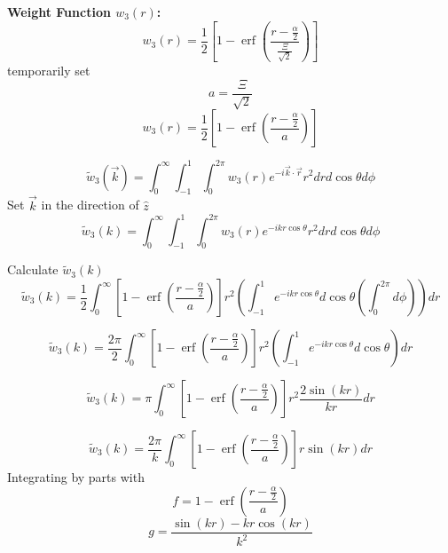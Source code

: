 \documentclass[letterpaper,twocolumn,amsmath,amssymb,prb]{revtex4-1}
\begin{document}
\begin{widetext}
\noindent\textbf{Weight Function $w_3(r)$:}
\begin{equation}
    w_3(r)=\frac{1}{2}\left[1-\operatorname{erf}\left(\frac{r-\frac{\alpha}{2}}{\frac{\Xi}{\sqrt{2}}}\right)\right]
\end{equation}
temporarily set 
\begin{equation}{a=\frac{\Xi}{\sqrt{2}}}\end{equation}
\begin{equation}{w_3(r)=\frac{1}{2}\left[1-\operatorname{erf}\left(\frac{r-\frac{\alpha}{2}}{a}\right)\right]}\end{equation}

\begin{equation}{\widetilde{w}_3(\vec{k})=\int_{0}^{\infty}\int_{-1}^{1}\int_{0}^{2\pi}w_3(r)e^{-i\vec{k}\cdot{\vec{r}}}r^2d{r}d{\cos\theta}d{\phi}}\end{equation}
Set $\vec{k}$ in the direction of $\hat{z}$ 
\begin{equation}{\widetilde{w}_3(k)=\int_{0}^{\infty}\int_{-1}^{1}\int_{0}^{2\pi}w_3(r)e^{-ikr\cos\theta}r^2d{r}d{\cos\theta}d{\phi}}\end{equation}

\noindent Calculate $\widetilde{w}_3(k)$ 
\begin{equation}{\widetilde{w}_3(k)=\frac{1}{2}\int_{0}^{\infty}\left[1-\operatorname{erf}\left(\frac{r-\frac{\alpha}{2}}{a}\right)\right]r^2\left(\int_{-1}^{1}e^{-ikr\cos\theta}d{\cos\theta}\left(\int_{0}^{2\pi}d{\phi}\right)\right)d{r}}\end{equation}
\[{}\]

\begin{equation}{\widetilde{w}_3(k)=\frac{2\pi}{2}\int_{0}^{\infty}\left[1-\operatorname{erf}\left(\frac{r-\frac{\alpha}{2}}{a}\right)\right]r^2\left(\int_{-1}^{1}e^{-ikr\cos\theta}d{\cos\theta}\right)d{r}}\end{equation}

\begin{equation}{\widetilde{w}_3(k)=\pi\int_{0}^{\infty}\left[1-\operatorname{erf}\left(\frac{r-\frac{\alpha}{2}}{a}\right)\right]r^2\frac{2\sin(kr)}{kr}d{r}}\end{equation}

\begin{equation}{\widetilde{w}_3(k)=\frac{2\pi}{k}\int_{0}^{\infty}\left[1-\operatorname{erf}\left(\frac{r-\frac{\alpha}{2}}{a}\right)\right]r\sin(kr)d{r}}\end{equation}
Integrating by parts with 
\begin{displaymath}{f=1-\operatorname{erf}\left(\frac{r-\frac{\alpha}{2}}{a}\right)}\end{displaymath}
\begin{displaymath}{g=\frac{\sin(kr)-kr\cos(kr)}{k^2}}\end{displaymath}


\end{widetext}
\end{document}
